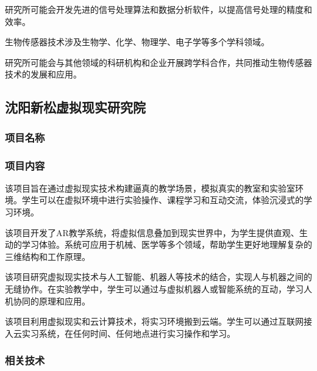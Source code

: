 研究所可能会开发先进的信号处理算法和数据分析软件，以提高信号处理的精度和效率。


生物传感器技术涉及生物学、化学、物理学、电子学等多个学科领域。

研究所可能会与其他领域的科研机构和企业开展跨学科合作，共同推动生物传感器技术的发展和应用。

\subsection{沈阳新松虚拟现实研究院}\label{沈阳新松虚拟现实研究院}


\subsubsection{项目名称}






\subsubsection{项目内容}


该项目旨在通过虚拟现实技术构建逼真的教学场景，模拟真实的教室和实验室环境。学生可以在虚拟环境中进行实验操作、课程学习和互动交流，体验沉浸式的学习环境。


该项目开发了AR教学系统，将虚拟信息叠加到现实世界中，为学生提供直观、生动的学习体验。系统可应用于机械、医学等多个领域，帮助学生更好地理解复杂的三维结构和工作原理。


该项目研究虚拟现实技术与人工智能、机器人等技术的结合，实现人与机器之间的无缝协作。在实验教学中，学生可以通过与虚拟机器人或智能系统的互动，学习人机协同的原理和应用。


该项目利用虚拟现实和云计算技术，将实习环境搬到云端。学生可以通过互联网接入云实习系统，在任何时间、任何地点进行实习操作和学习。

\subsubsection{相关技术}

